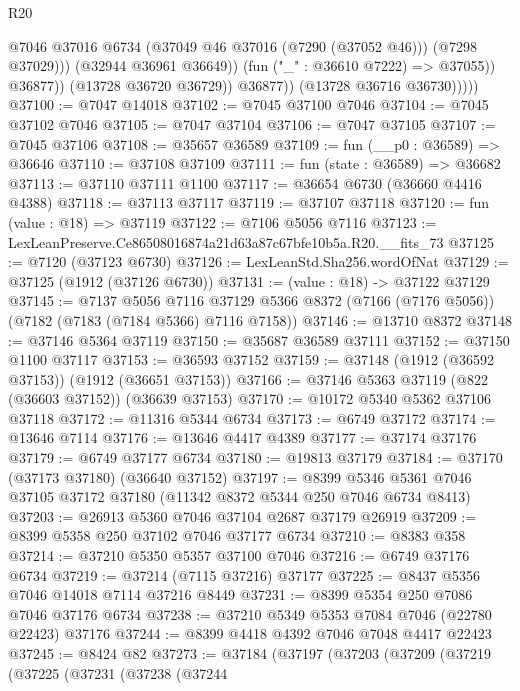 \begin{lexlean}{R20}
\begin{coremodule}
{                              @7046
                              @37016
                              @6734
                              (@37049 @46 @37016 (@7290 (@37052 @46)))
                              (@7298 @37029)))
                          (@32944 @36961 @36649))
                        (fun ("_" : @36610 @7222) => @37055))
                      @36877))
                  (@13728 @36720 @36729))
                @36877))
            (@13728 @36716 @36730)))))
@37100 := @7047 @14018
@37102 := @7045 @37100 @7046
@37104 := @7045 @37102 @7046
@37105 := @7047 @37104
@37106 := @7047 @37105
@37107 := @7045 @37106
@37108 := @35657 @36589
@37109 := fun (__p0 : @36589) => @36646
@37110 := @37108 @37109
@37111 := fun (state : @36589) => @36682
@37113 := @37110 @37111 @1100
@37117 := @36654 @6730 (@36660 @4416 @4388)
@37118 := @37113 @37117
@37119 := @37107 @37118
@37120 := fun (value : @18) => @37119
@37122 := @7106 @5056 @7116
@37123 := LexLeanPreserve.Ce86508016874a21d63a87c67bfe10b5a.R20.__fits_73
@37125 := @7120 (@37123 @6730)
@37126 := LexLeanStd.Sha256.wordOfNat
@37129 := @37125 (@1912 (@37126 @6730))
@37131 := (value : @18) -> @37122 @37129
@37145 := @7137
    @5056
    @7116
    @37129
    @5366
    @8372
    (@7166 (@7176 @5056))
    (@7182 (@7183 (@7184 @5366) @7116 @7158))
@37146 := @13710 @8372
@37148 := @37146 @5364 @37119
@37150 := @35687 @36589 @37111
@37152 := @37150 @1100 @37117
@37153 := @36593 @37152
@37159 := @37148 (@1912 (@36592 @37153)) (@1912 (@36651 @37153))
@37166 := @37146 @5363 @37119 (@822 (@36603 @37152)) (@36639 @37153)
@37170 := @10172 @5340 @5362 @37106 @37118
@37172 := @11316 @5344 @6734
@37173 := @6749 @37172
@37174 := @13646 @7114
@37176 := @13646 @4417 @4389
@37177 := @37174 @37176
@37179 := @6749 @37177 @6734
@37180 := @19813 @37179
@37184 := @37170 (@37173 @37180) (@36640 @37152)
@37197 := @8399 @5346 @5361 @7046 @37105 @37172 @37180 (@11342 @8372 @5344 @250 @7046 @6734 @8413)
@37203 := @26913 @5360 @7046 @37104 @2687 @37179 @26919
@37209 := @8399 @5358 @250 @37102 @7046 @37177 @6734
@37210 := @8383 @358
@37214 := @37210 @5350 @5357 @37100 @7046
@37216 := @6749 @37176 @6734
@37219 := @37214 (@7115 @37216) @37177
@37225 := @8437 @5356 @7046 @14018 @7114 @37216 @8449
@37231 := @8399 @5354 @250 @7086 @7046 @37176 @6734
@37238 := @37210 @5349 @5353 @7084 @7046 (@22780 @22423) @37176
@37244 := @8399 @4418 @4392 @7046 @7048 @4417 @22423
@37245 := @8424 @82
@37273 := @37184
    (@37197
      (@37203
        (@37209
          (@37219
            (@37225
              (@37231
                (@37238
                  (@37244
}
\end{coremodule}
\end{lexlean}
